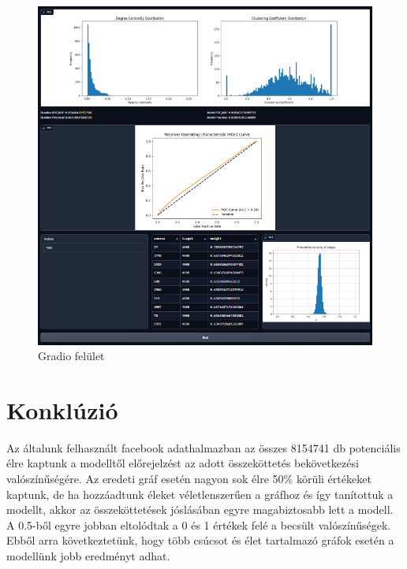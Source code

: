 \documentclass{article}
\begin{document}
			\begin{figure}[H]
				\centering
				\includegraphics[width=\linewidth]{Figures/gradio.png}
				\caption{Gradio felület}
			\end{figure}
	
	\section{Konklúzió}
	
		\par Az általunk felhasznált facebook adathalmazban az összes 8154741 db potenciális élre kaptunk a modelltől előrejelzést az adott összeköttetés bekövetkezési valószínűségére. Az eredeti gráf esetén nagyon sok élre 50\% körüli értékeket kaptunk, de ha hozzáadtunk éleket véletlenszerűen a gráfhoz és így tanítottuk a modellt, akkor az összeköttetések jóslásában egyre magabiztosabb lett a modell. A 0.5-ből egyre jobban eltolódtak a 0 és 1 értékek felé a becsült valószínűségek. Ebből arra következtetünk, hogy több csúcsot és élet tartalmazó gráfok esetén a modellünk jobb eredményt adhat.
		
\end{document}
